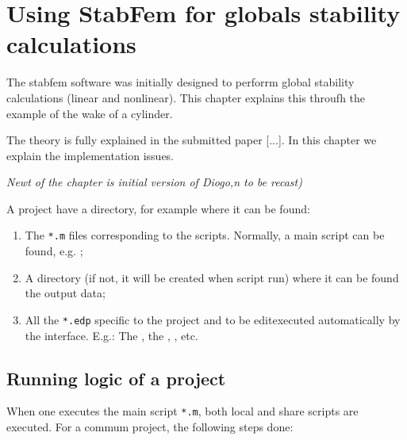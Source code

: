 
\chapter{Using StabFem for globals stability calculations}

The stabfem software was initially designed to perforrm global stability calculations (linear and nonlinear).
This chapter explains this throufh the example of the wake of a cylinder.

The theory is fully explained in the submitted paper [...]. In this chapter we explain the implementation issues.




{\em 
Newt of the chapter is initial version of Diogo,n to be recast)
}


A  project have a directory, for example  where it can be found: 
\begin{enumerate}
\item The \texttt{*.m} files corresponding to the  scripts. Normally, a main script can be found, e.g.  ;
\item A directory  (if not, it will be created when  script run) where it can be found the output data;
\item All the \texttt{*.edp} specific to the project and to be editexecuted automatically by the  interface. E.g.: The , the , , etc.
\end{enumerate}



\section{Running logic of a  project}


When one executes the main script \texttt{*.m}, both local and share scripts are executed. For a commum project, the following steps done:

